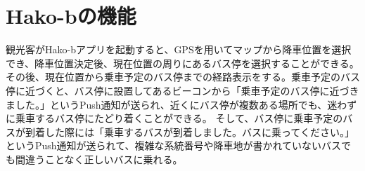 \documentclass[openany,11pt,papersize]{jsbook}
\begin{document}
\section{Hako-bの機能}
観光客がHako-bアプリを起動すると、GPSを用いてマップから降車位置を選択でき、降車位置決定後、現在位置の周りにあるバス停を選択することができる。
その後、現在位置から乗車予定のバス停までの経路表示をする。乗車予定のバス停に近づくと、バス停に設置してあるビーコンから「乗車予定のバス停に近づきました。」というPush通知が送られ、近くにバス停が複数ある場所でも、迷わずに乗車するバス停にたどり着くことができる。
そして、バス停に乗車予定のバスが到着した際には「乗車するバスが到着しました。バスに乗ってください。」というPush通知が送られて、複雑な系統番号や降車地が書かれていないバスでも間違うことなく正しいバスに乗れる。

\end{document}
